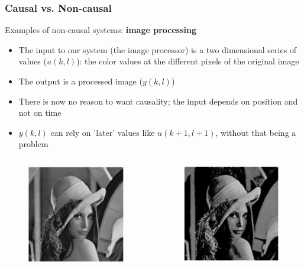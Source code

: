 \documentclass{beamer}
\begin{document}
\begin{frame}
\frametitle{Causal vs. Non-causal}
Examples of non-causal systems: \textbf{image processing}\\
\begin{itemize}
\item The input to our system (the image processor) is a two dimensional series of values ($u(k,l)$): the color values at the different pixels of the original image
\item The output is a processed image ($y(k,l)$)
\item There is now no reason to want causality; the input depends on position and not on time
\item $y(k,l)$ can rely on 'later' values like $u(k+1,l+1)$, without that being a problem
\end{itemize}
\vspace{-2ex}
\begin{columns}
\begin{figure}
\includegraphics[width=.5\linewidth]{original}
\end{figure}
\vspace{-4ex}

\begin{figure}
\includegraphics[width=.5\linewidth]{removed}
\end{figure}
\vspace{-4ex}


\end{columns}
\end{frame}
\end{document}
